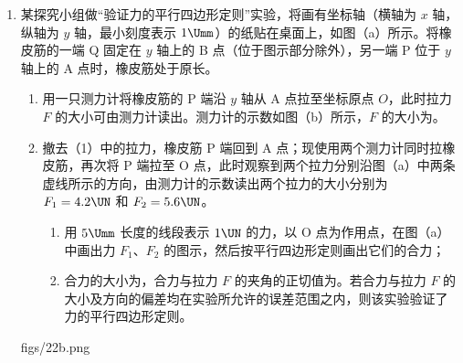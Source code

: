 \documentclass[\gkver]{gaokaozhenti}
\begin{document}
\begin{enumerate}

\item
某探究小组做“验证力的平行四边形定则”实验，将画有坐标轴（横轴为 $x$ 轴，纵轴为 $y$ 轴，最小刻度表示 $1\Umm$）的纸贴在桌面上，如图（a）所示。将橡皮筋的一端 Q 固定在 $y$ 轴上的 B 点（位于图示部分除外），另一端 P 位于 $y$ 轴上的 A 点时，橡皮筋处于原长。
\begin{enumerate}
	\item
	用一只测力计将橡皮筋的 P 端沿 $y$ 轴从 A 点拉至坐标原点 $O$，此时拉力 $F$ 的大小可由测力计读出。测力计的示数如图（b）所示，$F$ 的大小为\tkanswer[1cm]{$4.0\UN$}。
	\item
	撤去（1）中的拉力，橡皮筋 P 端回到 A 点；现使用两个测力计同时拉橡皮筋，再次将 P 端拉至 O 点，此时观察到两个拉力分别沿图（a）中两条虚线所示的方向，由测力计的示数读出两个拉力的大小分别为 $F_{1}=4.2\UN$ 和 $F_{2}=5.6\UN$。
	\begin{enumerate}
		\item
		用 $5\Umm$ 长度的线段表示 $1\UN$ 的力，以 O 点为作用点，在图（a）中画出力 $F_{1}$、$F_{2}$ 的图示，然后按平行四边形定则画出它们的合力；
		\item
		合力的大小为\tkanswer[1cm]{$4.0\UN$}，合力与拉力 $F$ 的夹角的正切值为。若合力与拉力 $F$ 的大小及方向的偏差均在实验所允许的误差范围之内，则该实验验证了力的平行四边形定则。
	\end{enumerate}
\end{enumerate}
{figs/22b.png}

\end{enumerate}
\end{document}
